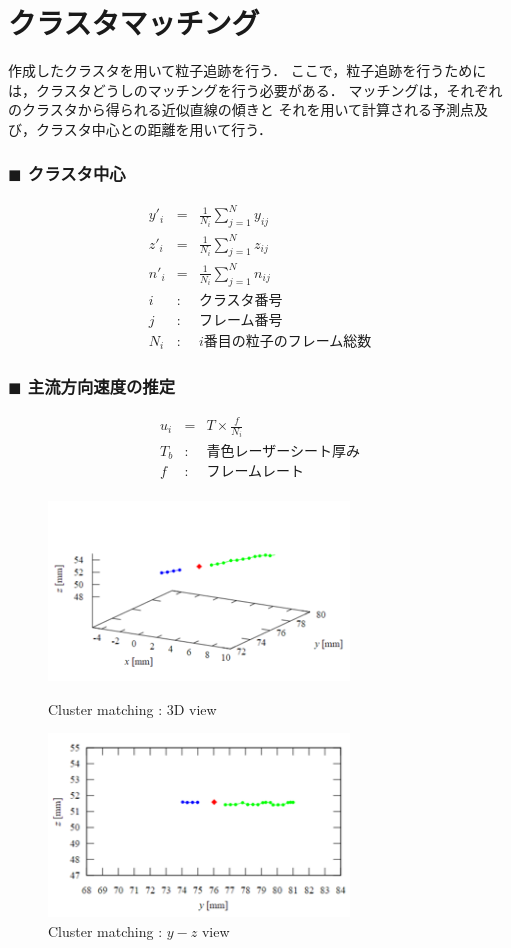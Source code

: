 \documentclass[twocolumn,a4j]{jsarticle}
\begin{document}
\section{クラスタマッチング}
作成したクラスタを用いて粒子追跡を行う．
ここで，粒子追跡を行うためには，クラスタどうしのマッチングを行う必要がある．
マッチングは，それぞれのクラスタから得られる近似直線の傾きと
それを用いて計算される予測点及び，クラスタ中心との距離を用いて行う．\\

\subsubsection*{$\blacksquare$ クラスタ中心}
\begin{eqnarray*}
	y'_i &=& \frac{1}{N_i} \sum_{j=1}^{N} y_{ij} \\
	z'_i &=& \frac{1}{N_i} \sum_{j=1}^{N} z_{ij} \\
	n'_i &=& \frac{1}{N_i} \sum_{j=1}^{N} n_{ij} \\
	i &:& \text{クラスタ番号}\\
	j &:& \text{フレーム番号}\\
	N_i &:& i \text{番目の粒子のフレーム総数}
\end{eqnarray*}

\subsubsection*{$\blacksquare$ 主流方向速度の推定}
\begin{eqnarray*}
	u_i &=& T \times \frac{f}{N_i}\\
	T_b &:& \text{青色レーザーシート厚み} \\
	f &:& \text{フレームレート}\\
\end{eqnarray*}

\begin{figure}[htbp]
	\centering
	\includegraphics[keepaspectratio, width=80mm]{../images/cluster_matching_1.png}
	\caption{Cluster matching : 3D view}
	\includegraphics[keepaspectratio, width=80mm]{../images/cluster_matching_2.png}
	\caption{Cluster matching : $y-z$ view}
\end{figure}
\end{document}
